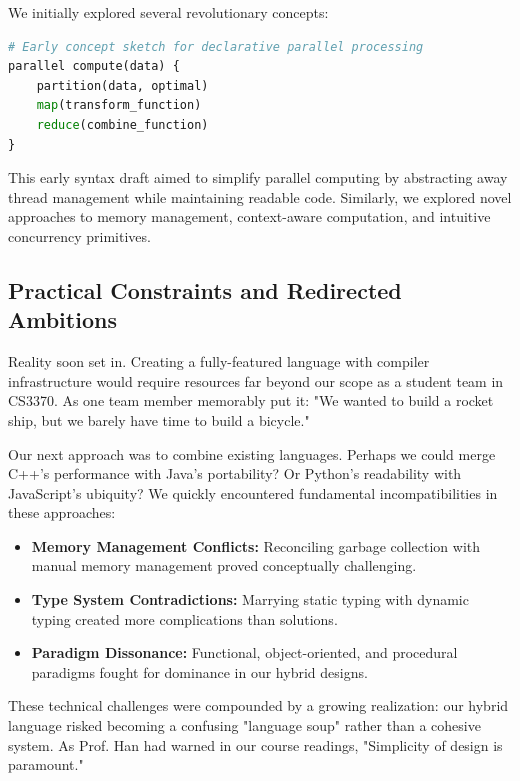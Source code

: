 \documentclass[conference]{IEEEtran}
\begin{document}
We initially explored several revolutionary concepts:
\begin{lstlisting}[language=Python, caption={Early concept sketch for declarative parallel processing}, label={lst:parallel_concept}]
# Early concept sketch for declarative parallel processing
parallel compute(data) {
    partition(data, optimal)
    map(transform_function)
    reduce(combine_function)
}
\end{lstlisting}
This early syntax draft aimed to simplify parallel computing by abstracting away thread management while maintaining readable code. Similarly, we explored novel approaches to memory management, context-aware computation, and intuitive concurrency primitives.

\subsection{Practical Constraints and Redirected Ambitions}
Reality soon set in. Creating a fully-featured language with compiler infrastructure would require resources far beyond our scope as a student team in CS3370. As one team member memorably put it: "We wanted to build a rocket ship, but we barely have time to build a bicycle."

Our next approach was to combine existing languages. Perhaps we could merge C++'s performance with Java's portability? Or Python's readability with JavaScript's ubiquity? We quickly encountered fundamental incompatibilities in these approaches:
\begin{itemize}
    \item \textbf{Memory Management Conflicts:} Reconciling garbage collection with manual memory management proved conceptually challenging.
    \item \textbf{Type System Contradictions:} Marrying static typing with dynamic typing created more complications than solutions.
    \item \textbf{Paradigm Dissonance:} Functional, object-oriented, and procedural paradigms fought for dominance in our hybrid designs.
\end{itemize}
These technical challenges were compounded by a growing realization: our hybrid language risked becoming a confusing "language soup" rather than a cohesive system. As Prof. Han had warned in our course readings, "Simplicity of design is paramount."
\end{document}
